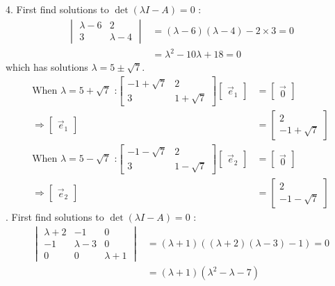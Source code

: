 \documentclass[11pt]{homework}
\begin{document}
4. First find solutions to $\det (\lambda I - A) = 0 $ :
\begin{align*}
  \begin{vmatrix}
  \lambda -6 & 2 \\
  3 & \lambda -4
  \end{vmatrix}
  &=  (\lambda - 6)(\lambda-4) - 2 \times 3 = 0 \\
  &= \lambda^2 - 10 \lambda +18 =0
\end{align*}
which has solutions $\lambda = 5 \pm \sqrt{7}$.
\begin{align*}
\text{When $\lambda = 5 + \sqrt{7}$ :}
  \begin{bmatrix}
  -1 + \sqrt{7} & 2 \\
  3 & 1+\sqrt{7}
  \end{bmatrix} 
  \begin{bmatrix}
  \vec e_1
  \end{bmatrix}
  &=
  \begin{bmatrix}
  \vec 0
  \end{bmatrix} \\
\Rightarrow
  \begin{bmatrix}
  \vec e_1
  \end{bmatrix}
  &=
\begin{bmatrix}
  2 \\
  - 1 + \sqrt{7}
\end{bmatrix} \\
\text{When $\lambda = 5 - \sqrt{7}$ :}
  \begin{bmatrix}
  -1 - \sqrt{7} & 2 \\
  3 & 1-\sqrt{7}
  \end{bmatrix} 
  \begin{bmatrix}
  \vec e_2
  \end{bmatrix}
  &=
  \begin{bmatrix}
  \vec 0
  \end{bmatrix} \\
\Rightarrow
  \begin{bmatrix}
  \vec e_2
  \end{bmatrix}
  &=
\begin{bmatrix}
  2 \\
  - 1 - \sqrt{7}
\end{bmatrix}
\end{align*}
. First find solutions to $\det (\lambda I - A) = 0 $ :
\begin{align*}
  \begin{vmatrix}
  \lambda+2 & -1 & 0 \\
  -1  & \lambda-3 & 0 \\
  0  & 0 & \lambda+1
  \end{vmatrix} 
  &= (\lambda+1)((\lambda +2)(\lambda-3) - 1) =0 \\
  &= (\lambda+1)(\lambda^2 - \lambda -7)
\end{align*}
\end{document}
